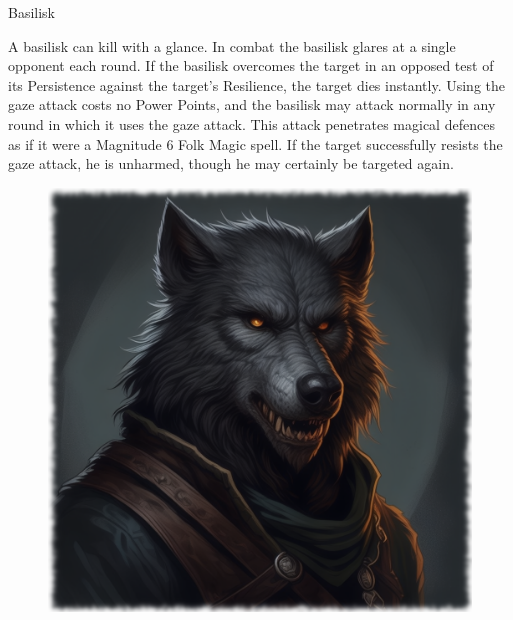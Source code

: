 \begin{monsterbox}{Basilisk}
\begin{rpg-monsteraction}
	\end{rpg-monsteraction}
	\begin{rpg-monsteraction}
		A basilisk can kill with a glance. In combat the basilisk glares at a single opponent each round. If the basilisk overcomes the target in an opposed test of its Persistence against the target’s Resilience, the target dies instantly. Using the gaze attack costs no Power Points, and the basilisk may attack normally in any round in which it uses the gaze attack. This attack penetrates magical defences as if it were a Magnitude 6 Folk Magic spell. If the target successfully resists the gaze attack, he is unharmed, though he may certainly be targeted again. 
	\end{rpg-monsteraction}

\end{monsterbox}


\begin{figure}[h]
\begin{center}
\includegraphics[scale=0.24]{img/ai-images/wolfman.png}
\end{center}
\end{figure}

